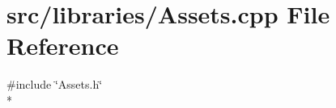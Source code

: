\section{src/libraries/\-Assets.cpp File Reference}
\label{_assets_8cpp}
{\ttfamily \#include \char`\"{}Assets.\-h\char`\"{}}\\*
